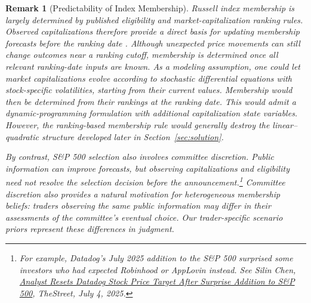 \documentclass[12pt]{article}
\numberwithin{equation}{section}
\newtheorem{remark}[theorem]{Remark}
\theoremstyle{definition}
\begin{document}
\begin{remark}[Predictability of Index Membership]\label{rem:membership_predictability}
Russell index membership is largely determined by published eligibility and
market-capitalization ranking rules. Observed capitalizations therefore
provide a direct basis for updating membership forecasts before the ranking
date \citep{PegoraroSammonShim2026}. Although unexpected price movements can
still change outcomes near a ranking cutoff, membership is determined once
all relevant ranking-date inputs are known. As a modeling assumption, one
could let market capitalizations evolve according to stochastic differential
equations with stock-specific volatilities, starting from their current
values. Membership would then be determined from their rankings at the
ranking date. This would admit a
dynamic-programming formulation with additional capitalization state
variables. However, the ranking-based membership rule would generally
destroy the linear--quadratic structure developed later in
Section~\ref{sec:solution}.

By contrast, S\&P 500 selection also involves committee discretion. Public
information can improve forecasts, but observing capitalizations and
eligibility need not resolve the selection decision before the
announcement.\footnote{For example, Datadog's July 2025 addition to the
S\&P 500 surprised some investors who had expected Robinhood or AppLovin
instead. See Silin Chen,
\href{https://www.thestreet.com/investing/analyst-resets-datadog-stock-price-target-after-surprise-addition-to-s-p-500}
{\emph{Analyst Resets Datadog Stock Price Target After Surprise Addition to
S\&P 500}}, TheStreet, July 4, 2025.}
Committee discretion also provides a natural motivation for heterogeneous
membership beliefs: traders observing the same public information may differ
in their assessments of the committee's eventual choice. Our trader-specific
scenario priors represent these differences in judgment.
\end{remark}
\end{document}

